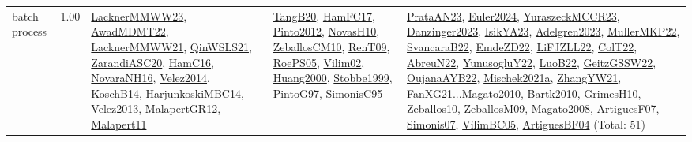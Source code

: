 {\begin{longtable}{p{3cm}r>{\raggedright\arraybackslash}p{6cm}>{\raggedright\arraybackslash}p{6cm}>{\raggedright\arraybackslash}p{8cm}}
\index{batch process}\index{Concepts!batch process}batch process &  1.00 & \hyperref[detail:LacknerMMWW23]{LacknerMMWW23}, \hyperref[detail:AwadMDMT22]{AwadMDMT22}, \hyperref[detail:LacknerMMWW21]{LacknerMMWW21}, \hyperref[detail:QinWSLS21]{QinWSLS21}, \hyperref[detail:ZarandiASC20]{ZarandiASC20}, \hyperref[detail:HamC16]{HamC16}, \hyperref[detail:NovaraNH16]{NovaraNH16}, \hyperref[detail:Velez2014]{Velez2014}, \hyperref[detail:KoschB14]{KoschB14}, \hyperref[detail:HarjunkoskiMBC14]{HarjunkoskiMBC14}, \hyperref[detail:Velez2013]{Velez2013}, \hyperref[detail:MalapertGR12]{MalapertGR12}, \hyperref[detail:Malapert11]{Malapert11} & \hyperref[detail:TangB20]{TangB20}, \hyperref[detail:HamFC17]{HamFC17}, \hyperref[detail:Pinto2012]{Pinto2012}, \hyperref[detail:NovasH10]{NovasH10}, \hyperref[detail:ZeballosCM10]{ZeballosCM10}, \hyperref[detail:RenT09]{RenT09}, \hyperref[detail:RoePS05]{RoePS05}, \hyperref[detail:Vilim02]{Vilim02}, \hyperref[detail:Huang2000]{Huang2000}, \hyperref[detail:Stobbe1999]{Stobbe1999}, \hyperref[detail:PintoG97]{PintoG97}, \hyperref[detail:SimonisC95]{SimonisC95} & \hyperref[detail:PrataAN23]{PrataAN23}, \hyperref[detail:Euler2024]{Euler2024}, \hyperref[detail:YuraszeckMCCR23]{YuraszeckMCCR23}, \hyperref[detail:Danzinger2023]{Danzinger2023}, \hyperref[detail:IsikYA23]{IsikYA23}, \hyperref[detail:Adelgren2023]{Adelgren2023}, \hyperref[detail:MullerMKP22]{MullerMKP22}, \hyperref[detail:SvancaraB22]{SvancaraB22}, \hyperref[detail:EmdeZD22]{EmdeZD22}, \hyperref[detail:LiFJZLL22]{LiFJZLL22}, \hyperref[detail:ColT22]{ColT22}, \hyperref[detail:AbreuN22]{AbreuN22}, \hyperref[detail:YunusogluY22]{YunusogluY22}, \hyperref[detail:LuoB22]{LuoB22}, \hyperref[detail:GeitzGSSW22]{GeitzGSSW22}, \hyperref[detail:OujanaAYB22]{OujanaAYB22}, \hyperref[detail:Mischek2021a]{Mischek2021a}, \hyperref[detail:ZhangYW21]{ZhangYW21}, \hyperref[detail:FanXG21]{FanXG21}...\hyperref[detail:Magato2010]{Magato2010}, \hyperref[detail:Bartk2010]{Bartk2010}, \hyperref[detail:GrimesH10]{GrimesH10}, \hyperref[detail:Zeballos10]{Zeballos10}, \hyperref[detail:ZeballosM09]{ZeballosM09}, \hyperref[detail:Magato2008]{Magato2008}, \hyperref[detail:ArtiguesF07]{ArtiguesF07}, \hyperref[detail:Simonis07]{Simonis07}, \hyperref[detail:VilimBC05]{VilimBC05}, \hyperref[detail:ArtiguesBF04]{ArtiguesBF04} (Total: 51)\\

\end{longtable}}
